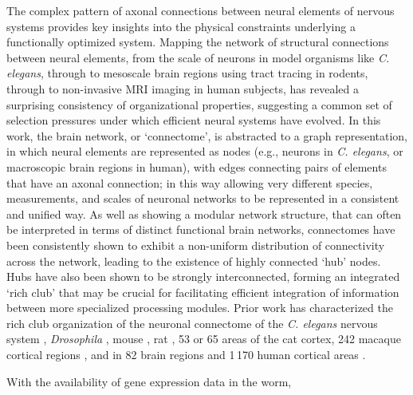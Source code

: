 \documentclass[10pt,letterpaper]{article}
\begin{document}
 The complex pattern of axonal connections between neural elements of nervous systems provides key insights into the physical constraints underlying a functionally optimized system.
 Mapping the network of structural connections between neural elements, from the scale of neurons in model organisms like \emph{C. elegans}, through to mesoscale brain regions using tract tracing in rodents, through to non-invasive MRI imaging in human subjects, has revealed a surprising consistency of organizational properties, suggesting a common set of selection pressures under which efficient neural systems have evolved.
 In this work, the brain network, or `connectome', is abstracted to a graph representation, in which neural elements are represented as nodes (e.g., neurons in \emph{C. elegans}, or macroscopic brain regions in human), with edges connecting pairs of elements that have an axonal connection; in this way allowing very different species, measurements, and scales of neuronal networks to be represented in a consistent and unified way.
 As well as showing a modular network structure, that can often be interpreted in terms of distinct functional brain networks, connectomes have been consistently shown to exhibit a non-uniform distribution of connectivity across the network, leading to the existence of highly connected `hub' nodes.
 Hubs have also been shown to be strongly interconnected, forming an integrated `rich club' that may be crucial for facilitating efficient integration of information between more specialized processing modules.
 Prior work has characterized the rich club organization of the neuronal connectome of the \emph{C. elegans} nervous system \cite{Towlson:2013gf}, \emph{Drosophila} \cite{Shih:2015cu}, mouse \cite{Fulcher:2016ck}, rat \cite{vandenHeuvel:2015ie}, 53 \cite{ZamoraLopez:2010hy} or 65 areas \cite{deReus:2013cy} of the cat cortex, 242 macaque cortical regions \cite{Harriger:2012bb}, and in 82 brain regions \cite{vandenHeuvel:2011he} and 1\,170 human cortical areas \cite{vandenHeuvel:2012kh}.

 With the availability of gene expression data in the worm,
\end{document}
